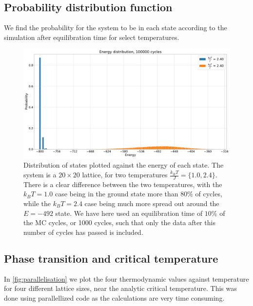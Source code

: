 \documentclass[../main.tex]{subfiles}
\begin{document}
\newpage

\subsection{Probability distribution function}

We find the probability for the system to be in each state according to the simulation after equilibration time for select temperatures.

\begin{figure}[htb!]
    \centering
    \includegraphics[trim=0.cm 0.cm 0.cm 1.15cm, clip,width=1.0\textwidth]{../figures/distribution_ising_20x20_1E5_cycles_T_1.0_2.4.pdf}
    \caption{Distribution of states plotted against the energy of each state. The system is a $20 \times 20$ lattice, for two temperatures $\frac{k_B T}{J} = \{1.0, 2.4\}$. There is a clear difference between the two temperatures, with the $k_B T = 1.0$ case being in the ground state more than 80\% of cycles, while the $k_B T = 2.4$ case being much more spread out around the $E = -492$ state. We have here used an equilibration time of $10\%$ of the MC cycles, or 1000 cycles, such that only the data after this number of cycles has passed is included.}
    \label{fig:energy-distribution}
\end{figure}


\subsection{Phase transition and critical temperature}

In \cref{fig:parallelisation} we plot the four thermodynamic values against temperature for four different lattice sizes, near the analytic critical temperature. This was done using parallellized code as the calculations are very time consuming. 
\end{document}
